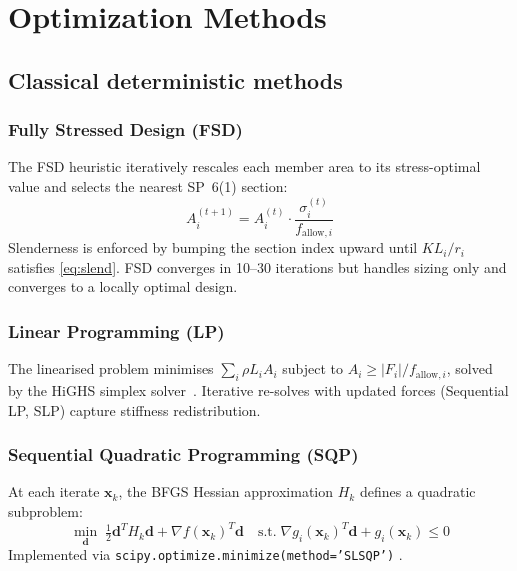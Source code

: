 \documentclass[lineno,pdflatex,sn-mathphys-num]{sn-jnl}
\begin{document}
\section{Optimization Methods}
\label{sec:methods}

\subsection{Classical deterministic methods}

\subsubsection{Fully Stressed Design (FSD)}
The FSD heuristic iteratively rescales each member area to its
stress-optimal value and selects the nearest SP~6(1) section:
\begin{equation}
  A_i^{(t+1)} = A_i^{(t)}\cdot
    \frac{\sigma_i^{(t)}}{f_{\mathrm{allow},i}}
  \label{eq:fsd}
\end{equation}
Slenderness is enforced by bumping the section index upward until
$KL_i/r_i$ satisfies \cref{eq:slend}.
FSD converges in 10--30 iterations but handles sizing only and
converges to a locally optimal design.

\subsubsection{Linear Programming (LP)}
The linearised problem minimises $\sum_i \rho L_i A_i$ subject to
$A_i \geq |F_i|/f_{\mathrm{allow},i}$, solved by the HiGHS simplex
solver~\citep{Huangfu2018}.
Iterative re-solves with updated forces (Sequential LP, SLP) capture
stiffness redistribution.

\subsubsection{Sequential Quadratic Programming (SQP)}
At each iterate $\mathbf{x}_k$, the BFGS Hessian approximation $H_k$
defines a quadratic subproblem:
\begin{equation}
  \min_{\mathbf{d}}\;\tfrac{1}{2}\mathbf{d}^T H_k\mathbf{d}
    + \nabla f(\mathbf{x}_k)^T\mathbf{d}
  \quad\text{s.t.}\;\nabla g_i(\mathbf{x}_k)^T\mathbf{d}
    + g_i(\mathbf{x}_k)\leq 0
  \label{eq:sqp}
\end{equation}
Implemented via \texttt{scipy.optimize.minimize(method='SLSQP')}
\citep{Virtanen2020}.
\end{document}
